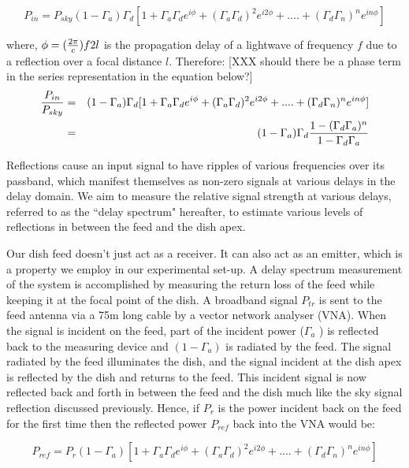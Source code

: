 \documentclass[12pt,preprint]{aastex}
\begin{document}
\begin{equation}
P_{in} =  P_{sky}(1-\Gamma_{a})\Gamma_{d} [1+ \Gamma_{a}\Gamma_{d} e^{i\phi}+ (\Gamma_{a}\Gamma_{d})^2e^{i2\phi}+ ....+ (\Gamma_{d}\Gamma_{n})^{n}e^{in\phi}]
\end{equation}

where, $\phi = ({2\pi \over c})f 2l$ is the propagation delay of a lightwave of frequency $f$ due to a reflection over a focal distance $l$. 
Therefore:
[XXX should there be a phase term in the series representation in the equation
below?]
\begin{eqnarray}
{P_{in} \over P_{sky} } & = & (1-\Gamma_{a})\Gamma_{d} [1+ \Gamma_{a}\Gamma_{d} e^{i\phi}+ (\Gamma_{a}\Gamma_{d})^2e^{i2\phi}+ ....+ (\Gamma_{d}\Gamma_{n})^{n}e^{in\phi}] \nonumber\\
      & = & (1-\Gamma_{a})\Gamma_{d} {1-(\Gamma_{d}\Gamma_{a})^{n} \over 1-\Gamma_{d} \Gamma_{a} } 
\end{eqnarray}

Reflections cause an input signal to have ripples of various frequencies over its passband, which manifest themselves as non-zero signals at various delays in the delay domain. We aim to measure the relative signal strength at various delays, referred to as the ``delay spectrum" hereafter, to estimate various levels of reflections in between the feed and the dish apex.
 
Our dish feed doesn't just act as a receiver. It can also act as an emitter, which is a property we employ in our experimental set-up. A delay spectrum measurement of the system is accomplished by measuring the return loss of the feed while keeping it at the focal point of the dish. A broadband signal $P_{tr}$ is sent to the feed antenna via a 75m long cable by a vector network analyser (VNA). When the signal is incident on the feed, part of the incident power ($\Gamma_{a}$ ) is reflected back to the measuring device and $(1-\Gamma_{a})$ is radiated by the feed. The signal radiated by the feed illuminates the dish, and the signal incident at the dish apex is reflected by the dish and returns to the feed. This incident signal is now reflected back and forth in between the feed and the dish much like the sky signal reflection discussed previously. Hence, if $P_{r}$ is the power incident back on the feed for the first time then the reflected power $P_{ref}$ back into the VNA would be:

\begin{equation}
P_{ref} =  P_{r}(1-\Gamma_{a}) [1+ \Gamma_{a}\Gamma_{d} e^{i\phi}+ (\Gamma_{a}\Gamma_{d})^2e^{i2\phi}+ ....+ (\Gamma_{d}\Gamma_{n})^{n}e^{in\phi}]
\end{equation}
 
\end{document}
